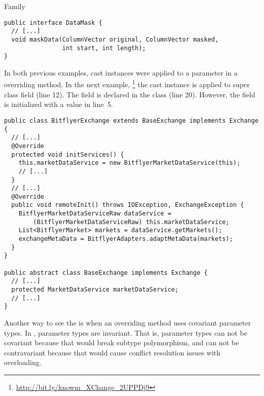 \begin{pattern}{Family}
\begin{verbatim}
public interface DataMask {
  // [...]
  void maskData(ColumnVector original, ColumnVector masked,
                int start, int length);
}

\end{verbatim}

In both previous examples,
cast instances were applied to a parameter in a overriding method.
In the next example,%
\footnote{\url{http://bit.ly/knowm_XChange_2UPPDj9}}
the cast instance is applied to super class field (line 12).
The field is declared in the  class (line 20).
However, the field is initialized with a  value in line~5.

\begin{verbatim}
public class BitflyerExchange extends BaseExchange implements Exchange {
  // [...]
  @Override
  protected void initServices() {
    this.marketDataService = new BitflyerMarketDataService(this);
    // [...]
  }
  // [...]
  @Override
  public void remoteInit() throws IOException, ExchangeException {
    BitflyerMarketDataServiceRaw dataService =
        (BitflyerMarketDataServiceRaw) this.marketDataService;
    List<BitflyerMarket> markets = dataService.getMarkets();
    exchangeMetaData = BitflyerAdapters.adaptMetaData(markets);
  }
}

public abstract class BaseExchange implements Exchange {
  // [...]
  protected MarketDataService marketDataService;
  // [...]
}
\end{verbatim}

\detection{}

\discussion{}
Another way to see the \thisp{} is when an overriding method uses covariant parameter types.
In \java{}, parameter types are invariant.
That is, parameter types can not be covariant because that would break subtype polymorphism,
and can not be contravariant because that would cause conflict resolution issues with overloading.

\cite{ernstFamilyPolymorphism2001}

\related{}

\end{pattern}